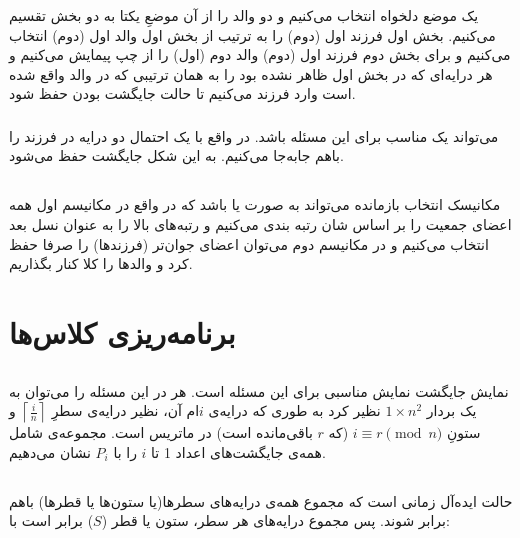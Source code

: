 \documentclass{article}
\begin{document}
\subsubsection{}
یک موضع دلخواه انتخاب می‌کنیم و دو والد را از آن موضعِ یکتا به دو بخش تقسیم می‌کنیم. بخش اول فرزند اول (دوم) را به ترتیب از بخش اول والد اول (دوم) انتخاب می‌کنیم و برای بخش دوم فرزند اول (دوم) والد دوم (اول) را از چپ پیمایش می‌کنیم و هر درایه‌ای که در بخش اول ظاهر نشده بود را به همان ترتیبی که در والد واقع شده است وارد فرزند می‌کنیم تا حالت جایگشت بودن حفظ شود.
\subsubsection{}
 می‌تواند یک  مناسب برای این مسئله باشد. در واقع با یک احتمال دو درایه در فرزند را باهم جابه‌جا می‌کنیم. به این شکل جایگشت حفظ می‌شود.
\subsection{}
مکانیسک انتخاب بازمانده می‌تواند به صورت  یا  باشد که در واقع در مکانیسم اول همه اعضای جمعیت را بر اساس شان رتبه بندی می‌کنیم و رتبه‌های بالا را به عنوان نسل بعد انتخاب می‌کنیم و در مکانیسم دوم می‌توان اعضای جوان‌تر (فرزندها) را صرفا حفظ کرد و والدها را کلا کنار بگذاریم.








\section{برنامه‌ریزی کلاس‌ها}
\subsection{}
نمایش جایگشت نمایش مناسبی برای این مسئله است. هر  در این مسئله را می‌توان به یک بردار
$1 \times n^2$
نظیر کرد به طوری که درایه‌ی $i$ام آن، نظیر درایه‌ی سطرِ
$
\left\lceil \frac{i}{n} \right\rceil
$
و ستونِ
$
i \equiv r \pmod{n} 
$
(که $r$ باقی‌مانده است) در ماتریس  است.
\newline
مجموعه‌ی شامل همه‌ی جایگشت‌های اعداد 1 تا $i$ را با $P_{i}$ نشان می‌دهیم.





\subsection{}
حالت ایده‌آل زمانی است که مجموع همه‌ی درایه‌های سطرها(یا ستون‌ها یا قطرها) باهم برابر شوند. پس مجموع درایه‌های هر سطر، ستون یا قطر ($S$) برابر است با:
\end{document}
